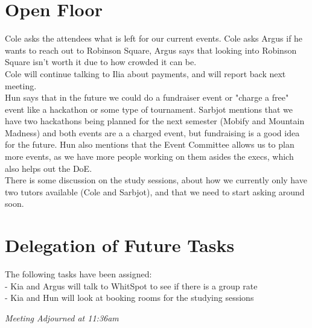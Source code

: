 \documentclass[12pt]{article}
\begin{document}
\section{Open Floor} \label{sec:Open-Floor}
\noindent Cole asks the attendees what is left for our current events. Cole asks Argus if he wants to reach out to Robinson Square, Argus says that looking into Robinson Square isn't worth it due to how crowded it can be. \\ 

\noindent Cole will continue talking to Ilia about payments, and will report back next meeting. \\ 

\noindent Hun says that in the future we could do a fundraiser event or "charge a free" event like a hackathon or some type of tournament. Sarbjot mentions that we have two hackathons being planned for the next semester (Mobify and Mountain Madness) and both events are a a charged event, but fundraising is a good idea for the future. Hun also mentions that the Event Committee allows us to plan more events, as we have more people working on them asides the execs, which also helps out the DoE.  \\

\noindent There is some discussion on the study sessions, about how we currently only have two tutors available (Cole and Sarbjot), and that we need to start asking around soon.  

\section{Delegation of Future Tasks} \label{sec: Future}
\noindent The following tasks have been assigned: \\
- Kia and Argus will talk to WhitSpot to see if there is a group rate \\
- Kia and Hun will look at booking rooms for the studying sessions 

\begin{center}
\em{Meeting Adjourned at 11:36am}
\end{center}
\end{document}
